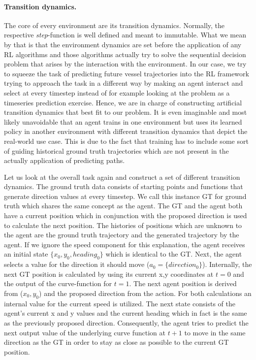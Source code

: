 \paragraph{Transition dynamics.} The core of every environment are its transition dynamics. Normally, the respective \textit{step}-function is well defined and meant to immutable. What we mean by that is that the environment dynamics are set before the application of any RL algorithms and those algorithms actually try to solve the sequential decision problem that arises by the interaction with the environment. In our case, we try to squeeze the task of predicting future vessel trajectories into the RL framework trying to approach the task in a different way by making an agent interact and select at every timestep instead of for example looking at the problem as a timeseries prediction exercise. Hence, we are in charge of constructing artificial transition dynamics that best fit to our problem. It is even imaginable and most likely unavoidable that an agent trains in one environment but uses its learned policy in another environment with different transition dynamics that depict the real-world use case. This is due to the fact that training has to include some sort of guiding historical ground truth trajectories which are not present in the actually application of predicting paths.
\par
Let us look at the overall task again and construct a set of different transition dynamics. The ground truth data consists of starting points and functions that generate direction values at every timestep. We call this instance GT for ground truth which shares the same concept as the agent. The GT and the agent both have a current position which in conjunction with the proposed direction is used to calculate the next position. The histories of positions which are unknown to the agent are the ground truth trajectory and the generated trajectory by the agent. If we ignore the speed component for this explanation, the agent receives an initial state $\{x_0,y_0,heading_0\}$ which is identical to the GT. Next, the agent selects a value for the direction it should move ($a_0=\{direction_0\}$). Internally, the next GT position is calculated by using its current x,y coordinates at $t=0$ and the output of the curve-function for $t=1$. The next agent position is derived from ($x_0, y_0$) and the proposed direction from the action. For both calculations an internal value for the current speed is utilized. The next state consists of the agent's current x and y values and the current heading which in fact is the same as the previously proposed direction. Consequently, the agent tries to predict the next output value of the underlying curve function at $t+1$ to move in the same direction as the GT in order to stay as close as possible to the current GT position.
